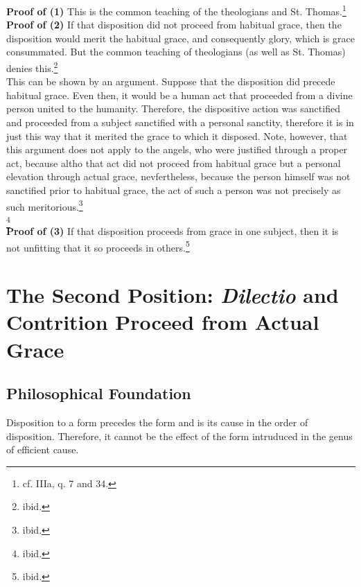 \documentclass[11pt]{memoir}
\begin{document}
    \noindent \textbf{Proof of (1)} This is the common teaching of the theologians and St. Thomas.\footnote{cf. IIIa, q. 7 and
    34.} \\

    \noindent \textbf{Proof of (2)} If that disposition did not proceed from habitual grace, then the disposition would merit the
    habitual grace, and consequently glory, which is grace consummated. But the common teaching of theologians (as well
    as St. Thomas) denies this.\footnote{ibid.} \\

    \noindent This can be shown by an argument. Suppose that the disposition did precede habitual grace. Even then, it
    would be a human act that proceeded from a divine person united to the humanity. Therefore, the dispositive action
    was sanctified and proceeded from a subject sanctified with a personal sanctity, therefore it is in just this way
    that it merited the grace to which it disposed. Note, however, that this argument does not apply to the angels, who
    were justified through a proper act, because altho that act did not proceed from habitual grace but a personal
    elevation through actual grace, nevfertheless, because the person himself was not sanctified prior to habitual
    grace, the act of such a person was not precisely as such meritorious.\footnote{ibid.} \\

    \footnote{ibid.} \\
    
    \noindent \textbf{Proof of (3)} If that disposition proceeds from grace in one subject, then it is not unfitting that it so
    proceeds in others.\footnote{ibid.} 


\section*{The Second Position: \emph{Dilectio} and Contrition Proceed from Actual Grace}

    \subsection*{Philosophical Foundation}

    Disposition to a form precedes the form and is its cause in the order of disposition. Therefore, it cannot be the
    effect of the form intruduced in the genus of efficient cause. \\
\end{document}
